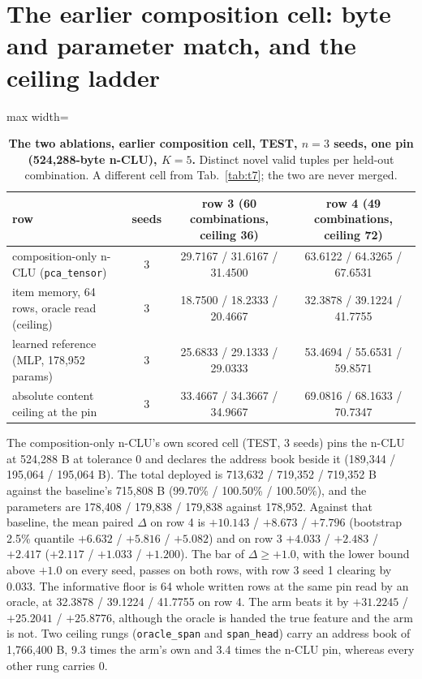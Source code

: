 \documentclass{article} %
\begin{document}
\section{The earlier composition cell: byte and parameter match, and the ceiling ladder}
\label{app:w5}

\begin{table}[h]
\centering\small
\caption{\textbf{The two ablations, earlier composition cell, TEST, $n=3$ seeds, one pin
(524,288-byte n-CLU), $K=5$.} Distinct novel valid tuples per held-out combination. A different cell from %
Tab.~\ref{tab:t7}; the two are never merged.}
\label{tab:ablations}
\setlength{\tabcolsep}{3pt}
\begin{adjustbox}{max width=\linewidth}\begin{tabular}{lccc}
\toprule
row & seeds & row 3 (60 combinations, ceiling 36) & row 4 (49 combinations, ceiling 72) \\ %
\midrule
composition-only n-CLU (\texttt{pca\_tensor}) & 3 & 29.7167 / 31.6167 / 31.4500 & 63.6122 / 64.3265 / 67.6531 \\
item memory, 64 rows, oracle read (ceiling) & 3 & 18.7500 / 18.2333 / 20.4667 & 32.3878 / 39.1224 / 41.7755 \\
learned reference (MLP, 178,952 params) & 3 & 25.6833 / 29.1333 / 29.0333 & 53.4694 / 55.6531 / 59.8571 \\
absolute content ceiling at the pin & 3 & 33.4667 / 34.3667 / 34.9667 & 69.0816 / 68.1633 / 70.7347 \\
\bottomrule
\end{tabular}\end{adjustbox}
\end{table}



The composition-only n-CLU's own scored cell (TEST, 3 seeds) pins the n-CLU at 524,288 B at
tolerance 0 and declares the address book beside it (189,344 / 195,064 / 195,064 B). The total
deployed is 713,632 / 719,352 / 719,352 B against the baseline's 715,808 B (99.70\% / 100.50\% /
100.50\%), and the parameters are 178,408 / 179,838 / 179,838 against 178,952. %
Against that baseline, the mean paired $\Delta$ on row 4 is $+10.143$ / $+8.673$ / $+7.796$
(bootstrap~\citep{efron_bootstrap_1979} 2.5\% quantile $+6.632$ / $+5.816$ / $+5.082$) and on row 3 $+4.033$ / $+2.483$ / $+2.417$
($+2.117$ / $+1.033$ / $+1.200$). The bar of $\Delta\ge+1.0$, with the lower bound above $+1.0$ on
every seed, passes on both rows, with row 3 seed 1 clearing by 0.033.
The informative floor is 64 whole written rows at the same pin read by an oracle, at 32.3878 /
39.1224 / 41.7755 on row 4. The arm beats it by $+31.2245$ / $+25.2041$ / $+25.8776$, although the
oracle is handed the true feature and the arm is not. %
Two ceiling rungs (\texttt{oracle\_span} and \texttt{span\_head}) carry an address book of 1,766,400
B, 9.3 times the arm's own and 3.4 times the n-CLU pin, whereas every other rung carries 0.
\end{document}
